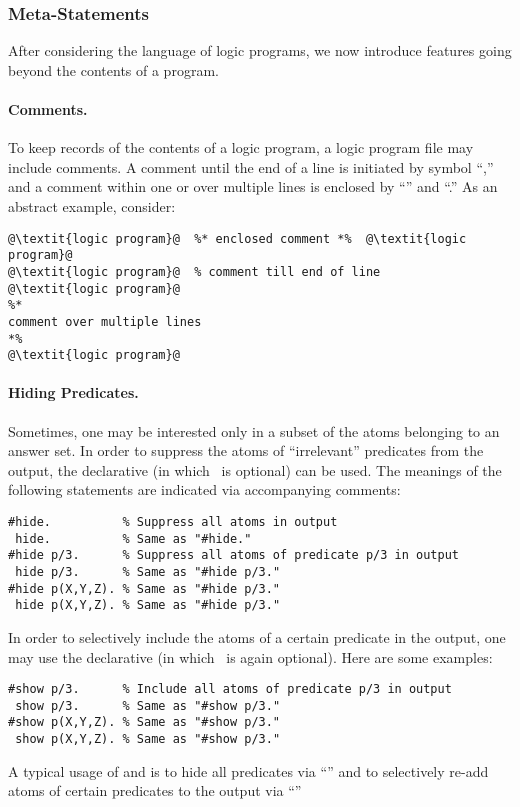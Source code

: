 \subsubsection{Meta-Statements}\label{subsec:gringo:meta}

After considering the language of logic programs,
we now introduce features going beyond the contents of a program.

\paragraph{Comments.}
To keep records of the contents of a logic program,
a logic program file may include comments.
A comment until the end of a line is initiated by symbol ``\code{\%},''
and a comment within one or over multiple lines is enclosed
by ``\code{\%*}'' and ``\code{*\%}.''
As an abstract example, consider:
%
\begin{lstlisting}[numbers=none,escapechar=@]
@\textit{logic program}@  %* enclosed comment *%  @\textit{logic program}@
@\textit{logic program}@  % comment till end of line
@\textit{logic program}@
%*
comment over multiple lines
*%
@\textit{logic program}@
\end{lstlisting}

\paragraph{Hiding Predicates.}
Sometimes, one may be interested only in a subset of the atoms belonging
to an answer set.
In order to suppress the atoms of ``irrelevant'' predicates from the output,
the  declarative (in which~\code{\#} is optional) can be used.
The meanings of the following statements are indicated via accompanying comments:
%
\begin{lstlisting}[numbers=none]
#hide.          % Suppress all atoms in output
 hide.          % Same as "#hide."
#hide p/3.      % Suppress all atoms of predicate p/3 in output
 hide p/3.      % Same as "#hide p/3."
#hide p(X,Y,Z). % Same as "#hide p/3."
 hide p(X,Y,Z). % Same as "#hide p/3."
\end{lstlisting}
%
In order to selectively include the atoms of a certain predicate in the output,
one may use the  declarative (in which~\code{\#} is again optional).
Here are some examples:
%
\begin{lstlisting}[numbers=none]
#show p/3.      % Include all atoms of predicate p/3 in output
 show p/3.      % Same as "#show p/3."
#show p(X,Y,Z). % Same as "#show p/3."
 show p(X,Y,Z). % Same as "#show p/3."
\end{lstlisting}
%
A typical usage of  and  is to hide all predicates
via ``'' and to selectively re-add atoms of certain predicates
 to the output via ``''


